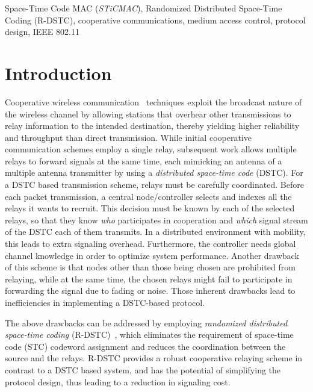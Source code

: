\documentclass[peerreview,draftcls,onecolumn,12pt,a4paper]{IEEEtran}
\begin{document}
\begin{keywords}
Space-Time Code   MAC (\emph{STiCMAC}), Randomized Distributed
Space-Time Coding (R-DSTC), cooperative communications, medium
access control, protocol design, IEEE 802.11
\end{keywords}

\newpage

\vspace{-0.5in}
\section{Introduction}
\label{Introduction}

Cooperative wireless communication~\cite{Sendonaris03a,Sendonaris03b,La03,La04} techniques exploit the broadcast nature of the wireless channel by allowing stations that overhear other transmissions to relay information to the intended destination, thereby yielding higher reliability and throughput than direct transmission. While initial cooperative communication schemes \cite{Sendonaris03a,Sendonaris03b} employ a single relay, subsequent work \cite{La04} allows multiple relays to forward signals at the same time, each mimicking an antenna of a multiple antenna transmitter by using a \emph{distributed space-time code} (DSTC). For a DSTC based transmission scheme, relays must be carefully coordinated. Before each packet transmission, a central node/controller selects and indexes all the relays it wants to recruit. This decision must be known by each of the selected relays, so that they know \emph{who} participates in cooperation and \emph{which} signal stream of the DSTC each of them transmits. In a distributed environment with mobility, this leads to extra signaling overhead. Furthermore, the controller needs global channel knowledge in order to optimize system performance. Another drawback of this scheme is that nodes other than those being chosen are prohibited from relaying, while at the same time, the chosen relays might fail to participate in forwarding the signal due to fading or noise. Those inherent drawbacks lead to inefficiencies in implementing a DSTC-based protocol.


The above drawbacks can be addressed by employing \emph{randomized distributed space-time coding} (R-DSTC)~\cite{sirkeci_scaglione_mergen_2007_SP}, which eliminates the requirement of space-time code (STC) codeword assignment and reduces the coordination between the source and the  relays. R-DSTC provides a robust cooperative relaying scheme in contrast to a DSTC based system, and has the potential of simplifying the protocol design, thus leading to a reduction in signaling cost.
\end{document}
